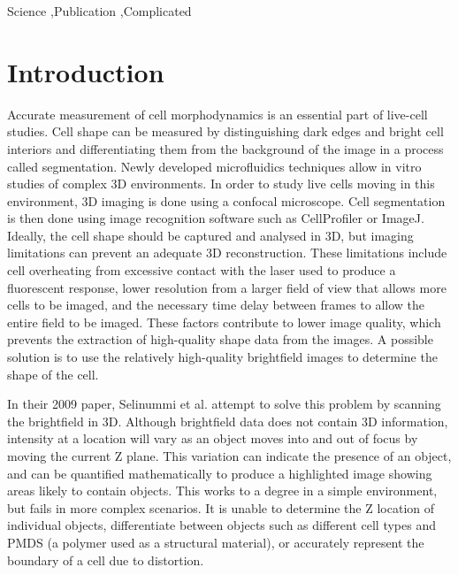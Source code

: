 \documentclass[preprint,11pt,5p,twocolumn]{elsarticle}
\begin{document}
\begin{frontmatter}
\begin{abstract}
\end{abstract}

\begin{keyword}
Science \sep Publication \sep Complicated


\end{keyword}

\end{frontmatter}


\section{Introduction}
\label{S:1}

Accurate measurement of cell morphodynamics is an essential part of live-cell studies. Cell shape can be measured by distinguishing dark edges and bright cell interiors and differentiating them from the background of the image in a process called segmentation. Newly developed microfluidics techniques allow in vitro studies of complex 3D environments. In order to study live cells moving in this environment, 3D imaging is done using a confocal microscope. Cell segmentation is then done using image recognition software such as CellProfiler or ImageJ. Ideally, the cell shape should be captured and analysed in 3D, but imaging limitations can prevent an adequate 3D reconstruction. These limitations include cell overheating from excessive contact with the laser used to produce a fluorescent response, lower resolution from a larger field of view that allows more cells to be imaged, and the necessary time delay between frames to allow the entire field to be imaged. These factors contribute to lower image quality, which prevents the extraction of high-quality shape data from the images. A possible solution is to use the relatively high-quality brightfield images to determine the shape of the cell.

In their 2009 paper, Selinummi et al. attempt to solve this problem by scanning the brightfield in 3D. Although brightfield data does not contain 3D information, intensity at a location will vary as an object moves into and out of focus by moving the current Z plane. This variation can indicate the presence of an object, and can be quantified mathematically to produce a highlighted image showing areas likely to contain objects. This works to a degree in a simple environment, but fails in more complex scenarios. It is unable to determine the Z location of individual objects, differentiate between objects such as different cell types and PMDS (a polymer used as a structural material), or accurately represent the boundary of a cell due to distortion.
\end{document}
